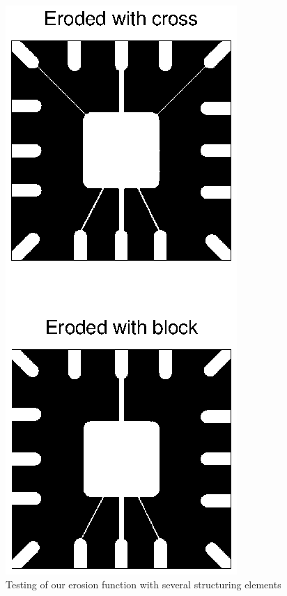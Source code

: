 \begin{figure}[htb]
 \centering
 \includegraphics[width=\linewidth]{erosion.eps}
 \caption{Testing of our erosion function with several structuring elements}
 \label{fig:erosion}
\end{figure}

